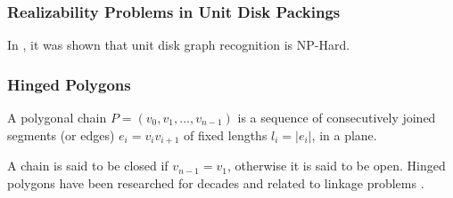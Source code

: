 \subsubsection{Realizability Problems in Unit Disk Packings}
In \cite{Breu19983}, it was shown that unit disk graph recognition is NP-Hard. 
% 
\subsubsection{Hinged Polygons}
\begin{definition}\label{def}
A polygonal chain $P = \left( v_0, v_1, \dots, v_{n-1}\right) $ is a sequence of
consecutively joined segments (or edges) $e_i = v_i v_{i+1}$ of fixed lengths
$l_i = \left\vert e_i\right\vert $, in a plane. \cite{Biedl99lockedand}
\end{definition}
A chain is said to be closed if $v_{n-1} = v_1$, otherwise it is said to be
open. Hinged polygons have been researched for decades and related to linkage problems
\cite{Biedl99lockedand,canny1988complexity}.

